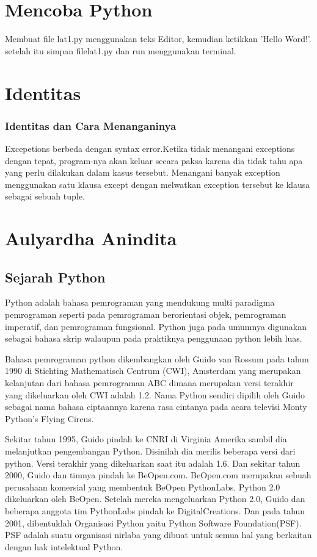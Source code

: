 \section{Mencoba Python}
Membuat file lat1.py menggunakan teks Editor, kemudian ketikkan 'Hello Word!'. setelah itu simpan filelat1.py dan run menggunakan terminal.
\section{Identitas}
\subsubsection{Identitas dan Cara Menanganinya}
Excepetions berbeda dengan syntax error.Ketika tidak menangani exceptions dengan tepat, program-nya akan keluar secara paksa karena dia tidak tahu apa yang perlu dilakukan dalam kasus tersebut. Menangani banyak exception menggunakan satu klausa except dengan melwatkan exception tersebut ke klausa sebagai sebuah tuple.

\section{Aulyardha Anindita}
\subsection{Sejarah Python}
Python adalah bahasa pemrograman yang mendukung multi paradigma pemrograman seperti pada pemrograman berorientasi objek, pemrograman imperatif, dan pemrograman fungsional. Python juga pada umumnya digunakan sebagai bahasa skrip walaupun pada praktiknya penggunaan python lebih luas. 

Bahasa pemrograman python dikembangkan oleh Guido van Rossum pada tahun 1990 di Stichting Mathematisch Centrum (CWI), Amsterdam yang merupakan kelanjutan dari bahasa pemrograman ABC dimana merupakan versi terakhir yang dikeluarkan oleh CWI adalah 1.2. Nama Python sendiri dipilih oleh Guido sebagai nama bahasa ciptaannya karena rasa cintanya pada acara televisi Monty Python’s Flying Circus.

Sekitar tahun 1995, Guido pindah ke CNRI di Virginia Amerika sambil dia melanjutkan pengembangan Python. Disinilah dia merilis beberapa versi dari python. Versi terakhir yang dikeluarkan saat itu adalah 1.6. Dan sekitar tahun 2000,  Guido dan timnya pindah ke BeOpen.com. BeOpen.com merupakan sebuah perusahaan komersial yang membentuk BeOpen PythonLabs. Python 2.0 dikeluarkan oleh BeOpen. Setelah mereka mengeluarkan Python 2.0, Guido dan beberapa anggota tim PythonLabs pindah ke DigitalCreations.
Dan pada tahun 2001, dibentuklah Organisasi Python yaitu Python Software  Foundation(PSF). PSF adalah suatu organisasi nirlaba yang dibuat untuk semua hal yang berkaitan dengan hak intelektual Python. 


